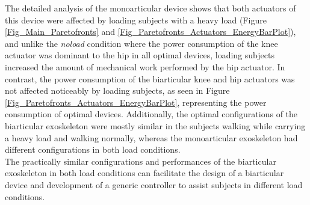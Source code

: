 \documentclass[10pt,letterpaper]{article}
\begin{document}
The detailed analysis of the monoarticular device shows that both actuators of this device were affected by loading subjects with a heavy load (Figure \ref{Fig_Main_Paretofronts} and \ref{Fig_Paretofronts_Actuators_EnergyBarPlot}), and unlike the \textit{noload} condition where the power consumption of the knee actuator was dominant to the hip in all optimal devices, loading subjects increased the amount of mechanical work performed by the hip actuator. In contrast, the power consumption of the biarticular knee and hip actuators was not affected noticeably by loading subjects, as seen in Figure \ref{Fig_Paretofronts_Actuators_EnergyBarPlot}, representing the power consumption of optimal devices. Additionally, the optimal configurations of the biarticular exoskeleton were mostly similar in the subjects walking while carrying a heavy load and walking normally, whereas the monoarticular exoskeleton had different configurations in both load conditions.\\
The practically similar configurations and performances of the biarticular exoskeleton in both load conditions can facilitate the design of a biarticular device and development of a generic controller to assist subjects in different load conditions.\\
\end{document}
